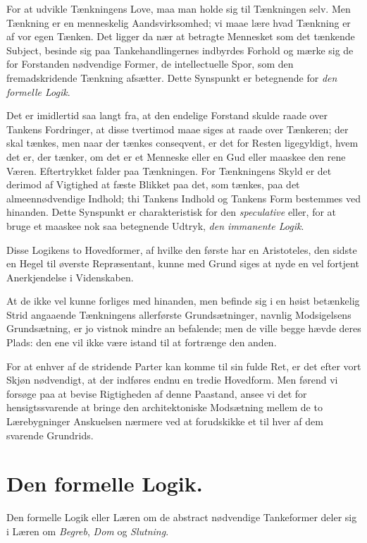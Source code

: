 \documentclass[12pt]{book}
\begin{document}
For at udvikle Tænkningens Love, maa man holde sig til Tænkningen
selv. Men Tænkning er en menneskelig Aandsvirksomhed; vi
maae lære hvad Tænkning er af vor egen Tænken. Det ligger da
nær at betragte Mennesket som det tænkende Subject, besinde sig paa
Tankehandlingernes indbyrdes Forhold og mærke sig de for Forstanden
nødvendige Former, de intellectuelle Spor, som den fremadskridende
Tænkning afsætter. Dette Synspunkt er betegnende for \emph{den
formelle Logik}.

Det er imidlertid saa langt fra, at den endelige Forstand skulde
raade over Tankens Fordringer, at disse tvertimod maae siges at raade
over Tænkeren; der skal tænkes, men naar der tænkes conseqvent, er
det for Resten ligegyldigt, hvem det er, der tænker, om det er et Menneske
eller en Gud eller maaskee den rene Væren. Eftertrykket falder
paa Tænkningen. For Tænkningens Skyld er det derimod af Vigtighed
at fæste Blikket paa det, som tænkes, paa det almeennødvendige
Indhold; thi Tankens Indhold og Tankens Form bestemmes ved hinanden.
Dette Synspunkt er charakteristisk for den \emph{speculative} eller,
for at bruge et maaskee nok saa betegnende Udtryk, \emph{den immanente
Logik}.

Disse Logikens to Hovedformer, af hvilke den første har en Aristoteles,
den sidste en Hegel til øverste Repræsentant, kunne med Grund
siges at nyde en vel fortjent Anerkjendelse i Videnskaben.

At de ikke vel kunne forliges med hinanden, men befinde sig i en
høist betænkelig Strid angaaende Tænkningens allerførste Grundsætninger,
navnlig Modsigelsens Grundsætning, er jo vistnok mindre an%
befalende; men de ville begge hævde deres Plads: den ene vil ikke være
istand til at fortrænge den anden.

For at enhver af de stridende Parter kan komme til sin fulde Ret,
er det efter vort Skjøn nødvendigt, at der indføres endnu en tredie
Hovedform. Men førend vi forsøge paa at bevise Rigtigheden af denne
Paastand, ansee vi det for hensigtssvarende at bringe den architektoniske
Modsætning mellem de to Lærebygninger Anskuelsen nærmere ved
at forudskikke et til hver af dem svarende Grundrids.

\section*{Den formelle Logik.}

Den formelle Logik eller Læren om de abstract nødvendige Tankeformer
deler sig i Læren om \emph{Begreb}, \emph{Dom} og \emph{Slutning}.
\end{document}
